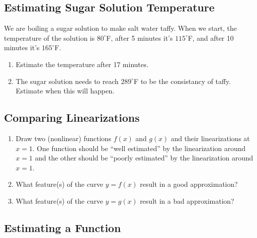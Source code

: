 \documentclass[
]{book}
\providecommand{\tightlist}{%
  \setlength{\itemsep}{0pt}\setlength{\parskip}{0pt}}
\begin{document}
\hypertarget{estimating-sugar-solution-temperature}{%
\subsection{Estimating Sugar Solution Temperature}\label{estimating-sugar-solution-temperature}}

We are boiling a sugar solution to make salt water taffy. When we start, the temperature of the solution is \(80^\circ\)F, after 5 minutes it's \(115^\circ\)F, and after 10 minutes it's \(165^\circ\)F.

\begin{enumerate}
\def\labelenumi{\arabic{enumi}.}
\tightlist
\item
  Estimate the temperature after 17 minutes.
\item
  The sugar solution needs to reach \(289^\circ\)F to be the consistancy of taffy. Estimate when this will happen.
\end{enumerate}

\hypertarget{comparing-linearizations}{%
\subsection{Comparing Linearizations}\label{comparing-linearizations}}

\begin{enumerate}
\def\labelenumi{\arabic{enumi}.}
\tightlist
\item
  Draw two (nonlinear) functions \(f(x)\) and \(g(x)\) and their linearizations at \(x=1\). One function should be ``well estimated'' by the linearization around \(x=1\) and the other should be ``poorly estimated'' by the linearization around \(x=1\).
\item
  What feature(s) of the curve \(y=f(x)\) result in a good approximation?
\item
  What feature(s) of the curve \(y=g(x)\) result in a bad approximation?
\end{enumerate}

\hypertarget{estimating-a-function}{%
\subsection{Estimating a Function}\label{estimating-a-function}}
\end{document}
